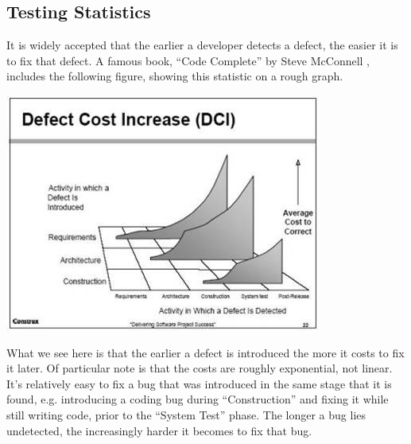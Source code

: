 \documentclass[12pt]{ucthesis}
\newenvironment{Figure}
  {\par\medskip\noindent\minipage{\linewidth}}
  {\endminipage\par\medskip}
\begin{document}
\subsection{Testing Statistics}
It is widely accepted that the earlier a developer detects a defect, the easier it is to fix that defect. A famous book, ``Code Complete'' by Steve McConnell \cite{DefectPic}, includes the following figure, showing this statistic on a rough graph.

\begin{Figure}
  \centering
	\includegraphics[width=0.75\linewidth]{defectcost.jpg} 
\end{Figure}

What we see here is that the earlier a defect is introduced the more it costs to fix it later. Of particular note is that the costs are roughly exponential, not linear. It's relatively easy to fix a bug that was introduced in the same stage that it is found, e.g. introducing a coding bug during ``Construction'' and fixing it while still writing code, prior to the ``System Test'' phase. The longer a bug lies undetected, the increasingly harder it becomes to fix that bug. 

\end{document}
